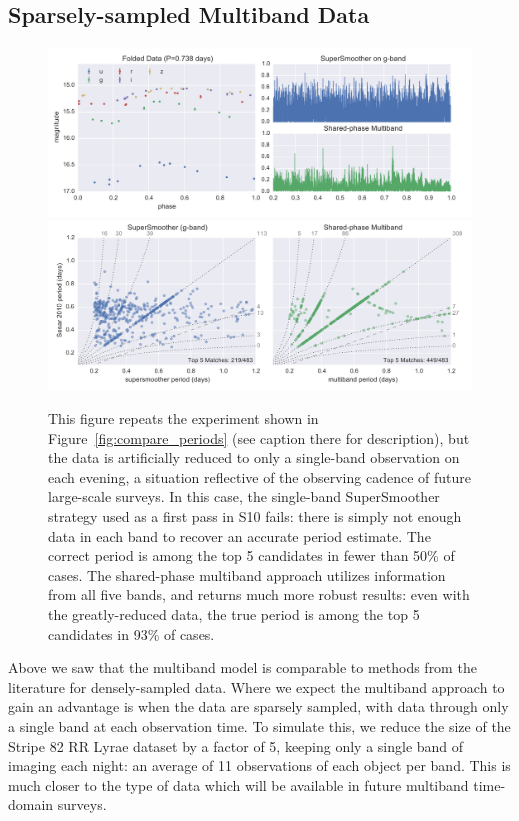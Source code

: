 \documentclass{emulateapj}
\newcommand{\Fig}[1]{Figure~\ref{fig:#1}}
\newcommand{\fig}[1]{\Fig{#1}}
\newcommand{\figlabel}[1]{\label{fig:#1}}
\begin{document}
\subsection{Sparsely-sampled Multiband Data}

\begin{figure}
  \centering
  \includegraphics[width=\textwidth]{fig08a.pdf}
  \includegraphics[width=\textwidth]{fig08b.pdf}
  \caption{
    This figure repeats the experiment shown in \fig{compare_periods} (see caption there for description), but the data is artificially reduced to only a single-band observation on each evening, a situation reflective of the observing cadence of future large-scale surveys.
    In this case, the single-band SuperSmoother strategy used as a first pass in S10 fails: there is simply not enough data in each band to recover an accurate period estimate. The correct period is among the top 5 candidates in fewer than 50\% of cases.
    The shared-phase multiband approach utilizes information from all five bands, and returns much more robust results: even with the greatly-reduced data, the true period is among the top 5 candidates in 93\% of cases.
  } 
  \figlabel{compare_periods_reduced}
\end{figure}

Above we saw that the multiband model is comparable to methods from the literature for densely-sampled data. Where we expect the multiband approach to gain an advantage is when the data are sparsely sampled, with data through only a single band at each observation time. To simulate this, we reduce the size of the Stripe 82 RR Lyrae dataset by a factor of 5, keeping only a single band of imaging each night: an average of 11 observations of each object per band. This is much closer to the type of data which will be available in future multiband time-domain surveys.
\end{document}
